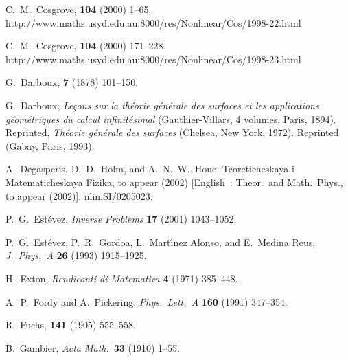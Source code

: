 \documentclass[10pt]{article}
\begin{document}
\begin{thebibliography}{99}
 C.~M.~Cosgrove,
{\it \SAM}{\bf 104} (2000) 1--65.
http://www.maths.usyd.edu.au:8000/res/Nonlinear/Cos/1998-22.html

 C.~M.~Cosgrove,
{\it \SAM}{\bf 104} (2000) 171--228.
http://www.maths.usyd.edu.au:8000/res/Nonlinear/Cos/1998-23.html

 G.~Darboux,
{\it \AnnENS} {\bf 7} (1878) 101--150.

 G.~Darboux, 
{\it Le\c cons sur la th\'eorie g\'en\'erale des surfaces et les applications
g\'eom\'etriques du calcul infinit\'esimal}
(Gau\-thier-Vil\-lars, 4 volumes, Paris, 1894).
Reprinted, {\it Th\'eorie g\'en\'erale des surfaces} (Chelsea, New York, 1972).
Reprinted (Gabay, Paris, 1993).

 A.~Degasperis, D.~D.~Holm, and A.~N.~W.~Hone,
Teoreticheskaya i Matematicheskaya Fizika, to appear (2002) 
        [English~: Theor.~and Math.~Phys., to appear (2002)].
nlin.SI/0205023. %

 P.~G.~Est\'evez,
{\it Inverse Problems} {\bf 17} (2001) 1043--1052.

 P.~G.~Est\'evez, P.~R.~Gordoa,
L.~Mart\'\i nez Alonso, and E.~Medina Reus,
{\it J.~Phys.~A} {\bf 26} (1993) 1915--1925.

 H.~Exton,
{\it Rendiconti di Matematica} {\bf 4} (1971) 385--448.

 A.~P.~Fordy and A.~Pickering,
{\it Phys.~Lett.~A} {\bf 160} (1991) 347--354.

 R.~Fuchs,
{\it \CRAS} {\bf 141} (1905) 555--558.

 B.~Gambier,
{\it Acta Math.}~{\bf 33} (1910) 1--55.


\end{thebibliography}
\end{document}
